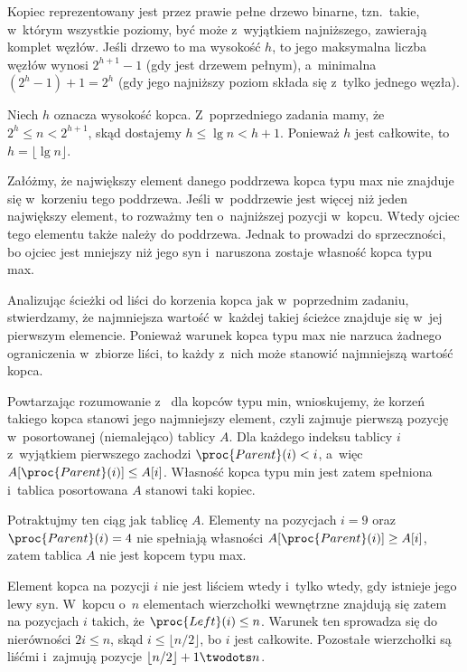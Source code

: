 
\exercise %
Kopiec reprezentowany jest przez prawie pełne drzewo binarne, tzn.\ takie, w~którym wszystkie poziomy, być może z~wyjątkiem najniższego, zawierają komplet węzłów.
Jeśli drzewo to ma wysokość $h$, to jego maksymalna liczba węzłów wynosi $2^{h+1}-1$ (gdy jest drzewem pełnym), a~minimalna $(2^h-1)+1=2^h$ (gdy jego najniższy poziom składa się z~tylko jednego węzła).

\exercise %
Niech $h$ oznacza wysokość kopca.
Z~poprzedniego zadania mamy, że $2^h\le n<2^{h+1}$, skąd dostajemy $h\le\lg n<h+1$.
Ponieważ $h$ jest całkowite, to $h=\lfloor\lg n\rfloor$.

\exercise %
Załóżmy, że największy element danego poddrzewa kopca typu max nie znajduje się w~korzeniu tego poddrzewa.
Jeśli w~poddrzewie jest więcej niż jeden największy element, to rozważmy ten o~najniższej pozycji w~kopcu.
Wtedy ojciec tego elementu także należy do poddrzewa.
Jednak to prowadzi do sprzeczności, bo ojciec jest mniejszy niż jego syn i~naruszona zostaje własność kopca typu max.

\exercise %
Analizując ścieżki od liści do korzenia kopca jak w~poprzednim zadaniu, stwierdzamy, że najmniejsza wartość w~każdej takiej ścieżce znajduje się w~jej pierwszym elemencie.
Ponieważ warunek kopca typu max nie narzuca żadnego ograniczenia w~zbiorze liści, to każdy z~nich może stanowić najmniejszą wartość kopca.

\exercise %
Powtarzając rozumowanie z~ dla kopców typu min, wnioskujemy, że korzeń takiego kopca stanowi jego najmniejszy element, czyli zajmuje pierwszą pozycję w~posortowanej (niemalejąco) tablicy $A$.
Dla każdego indeksu tablicy $i$ z~wyjątkiem pierwszego zachodzi $\proc{Parent}(i)<i$, a~więc $A[\proc{Parent}(i)]\le A[i]$.
Własność kopca typu min jest zatem spełniona i~tablica posortowana $A$ stanowi taki kopiec.

\exercise %
Potraktujmy ten ciąg jak tablicę $A$.
Elementy na pozycjach $i=9$ oraz $\proc{Parent}(i)=4$ nie spełniają własności $A[\proc{Parent}(i)]\ge A[i]$, zatem tablica $A$ nie jest kopcem typu max.

\exercise %
Element kopca na pozycji $i$ nie jest liściem wtedy i~tylko wtedy, gdy istnieje jego lewy syn.
W~kopcu o~$n$ elementach wierzchołki wewnętrzne znajdują się zatem na pozycjach $i$ takich, że $\proc{Left}(i)\le n$.
Warunek ten sprowadza się do nierówności $2i\le n$, skąd $i\le\lfloor n/2\rfloor$, bo $i$ jest całkowite.
Pozostałe wierzchołki są liśćmi i~zajmują pozycje $\lfloor n/2\rfloor+1\twodots n$.
